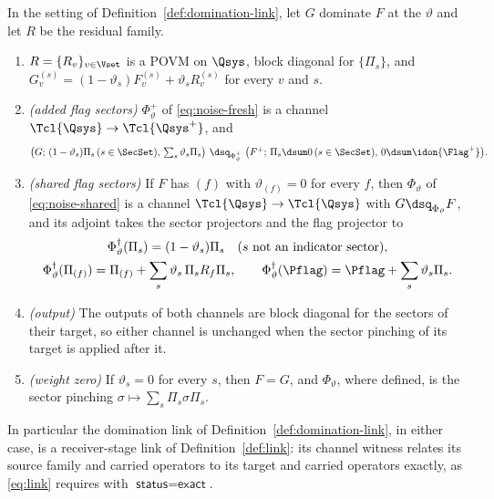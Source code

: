 \begin{theorem}\label{thm:noise-channel}
In the setting of Definition~\ref{def:domination-link}, let $G$ dominate $F$
at the  $\vartheta$ and let $R$ be the residual family.
\begin{enumerate}[label=(\roman*),leftmargin=3.0em]
\item $R=\{R_v\}_{v\in\Vset}$ is a POVM on $\Qsys$, block diagonal for
  $\{\Pi_s\}$, and
  $G^{(s)}_v=(1-\vartheta_s)F^{(s)}_v+\vartheta_sR^{(s)}_v$ for every $v$ and $s$.
\item \emph{(added flag sectors)} $\Phi^{+}_{\vartheta}$ of \eqref{eq:noise-fresh} is a
  channel $\Tcl{\Qsys}\to\Tcl{\Qsys^{+}}$, and
  \begin{equation}\label{eq:noise-fresh-relation}
    \big(G;\,(1-\vartheta_s)\Pi_s\,(s\in\SecSet),\,\textstyle\sum_s\vartheta_s\Pi_s\big)
    \ \dsq_{\Phi^{+}_{\vartheta}}\
    \big(F^{+};\,\Pi_s\dsum0\,(s\in\SecSet),\,0\dsum\idon{\Flag^{+}}\big).
  \end{equation}
\item \emph{(shared flag sectors)} If $F$ has  $(f)$ with
  $\vartheta_{(f)}=0$ for every $f$, then
  $\Phi_{\vartheta}$ of \eqref{eq:noise-shared} is a channel
  $\Tcl{\Qsys}\to\Tcl{\Qsys}$ with $G\dsq_{\Phi_{\vartheta}}F$, and its adjoint
  takes the sector projectors and the flag projector to
  \begin{equation}\label{eq:noise-shared-pullbacks}
  \begin{gathered}
    \Phi_{\vartheta}^{\dagger}(\Pi_s)=(1-\vartheta_s)\Pi_s\quad
    (s\text{ not an indicator sector}),\\
    \Phi_{\vartheta}^{\dagger}(\Pi_{(f)})=\Pi_{(f)}+\sum_{s}\vartheta_s\,
      \Pi_sR_f\Pi_s,\qquad
    \Phi_{\vartheta}^{\dagger}(\Pflag)=\Pflag+\sum_{s}\vartheta_s\Pi_s .
  \end{gathered}
  \end{equation}
\item \emph{(output)} The outputs of both channels are block diagonal for the
  sectors of their target, so either channel is unchanged when the sector
  pinching of its target is applied after it.
\item \emph{(weight zero)} If $\vartheta_s=0$ for every $s$, then $F=G$, and
  $\Phi_{\vartheta}$, where defined, is the sector pinching
  $\sigma\mapsto\sum_s\Pi_s\sigma\Pi_s$.
\end{enumerate}
In particular the domination link of Definition~\ref{def:domination-link}, in
either case, is a receiver-stage link of Definition~\ref{def:link}: its
channel witness relates its source family and carried operators to its
target and carried operators exactly, as \eqref{eq:link} requires with
$\textsf{status}=\textsf{exact}$.
\end{theorem}

